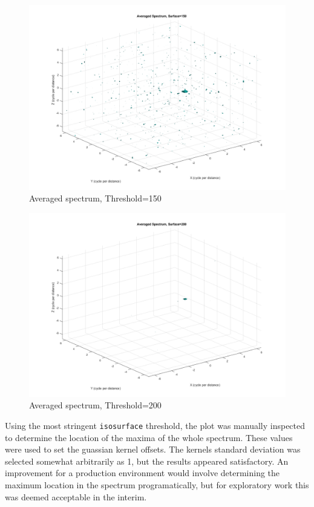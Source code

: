 \documentclass[journal]{IEEEtran}
\def\code#1{\texttt{#1}}
\begin{document}
\begin{figure}
	\centerline{\includegraphics[width=\columnwidth]{avg_spectrum_thresh150.png}}
	\caption{Averaged spectrum, Threshold=150}\label{spect150}
\end{figure}


\begin{figure}
	\centerline{\includegraphics[width=\columnwidth]{avg_spectrum_thresh200.png}}
	\caption{Averaged spectrum, Threshold=200}\label{spect200}
\end{figure}


Using the most stringent \code{isosurface} threshold, the plot was manually inspected to determine the location of the maxima of the whole spectrum. These values were used to set the guassian kernel offsets. The kernels standard deviation was selected somewhat arbitrarily as 1, but the results appeared satisfactory. An improvement for a production environment would involve determining the maximum location in the spectrum programatically, but for exploratory work this was deemed acceptable in the interim.
\end{document}
